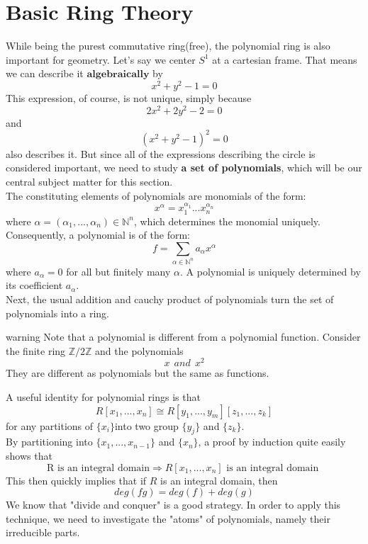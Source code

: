 \documentclass[11pt]{article}
\begin{document}
\section{Basic Ring Theory}

While being the purest commutative ring(free), the polynomial ring is also important for geometry. Let's say we center $S^1$ at a cartesian frame. That means we can describe it $\textbf{algebraically}$ by 
$$
x^2+y^2-1=0
$$
This expression, of course, is not unique, simply because 
$$
2x^2+2y^2-2=0
$$
and
$$
(x^2+y^2-1)^2=0
$$
also describes it. But since all of the expressions describing the circle is considered important, we need to study \textbf{a set of polynomials}, which will be our central subject matter for this section.\\

The constituting elements  of polynomials are monomials of the form:
$$
x^\alpha=x_1^{\alpha_1}...x_n^{\alpha_n}
$$
where $\alpha=(\alpha_1,...,\alpha_n)\in \mathbb{N}^n$, which determines the monomial uniquely. Consequently, a polynomial is of the form:
$$
f=\sum_{\alpha\in \mathbb{N}^n}a_\alpha x^\alpha 
$$
where $a_\alpha=0$ for all but finitely many $\alpha$. A polynomial is uniquely determined by its coefficient $a_\alpha$. \\

Next, the usual addition and cauchy product of polynomials turn the set of polynomials into a ring. 
\begin{mybox}{warning}
Note that a polynomial is different from a polynomial function. Consider the finite ring $\mathbb{Z}/2\mathbb{Z}$    and the polynomials 
$$
x \ \ and \ \ x^2
$$
They are different as polynomials but the same as functions. 
\end{mybox}
A useful identity for polynomial rings is that 
$$
R[x_1,...,x_n]\cong R[y_1,...,y_m][z_{1},...,z_k]
$$
for any partitions of $\{x_i\} $into two group $\{y_j\}$  and  $\{z_k\}$. 
\\

By partitioning into $\{x_1,...,x_{n-1}\}$ and $\{x_n\} $, a proof by induction quite easily shows that 
$$
\text{R is an integral domain} \Rightarrow \text{$R[x_1,...,x_n]$ is an integral domain }
$$
This then quickly implies that if $R$ is an integral domain, then 
$$
deg(fg)=deg(f)+deg(g)
$$
We know that "divide and conquer" is a good strategy. In order to apply this technique, we need to investigate the "atoms" of polynomials, namely their irreducible parts. \\
\end{document}
